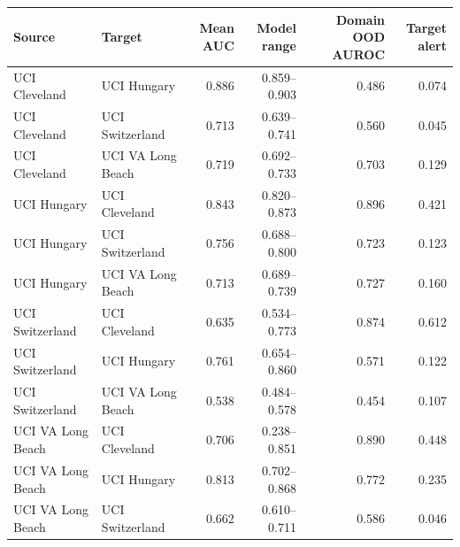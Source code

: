 \begin{tabular}{llrrrr}
\toprule
Source & Target & Mean AUC & Model range & Domain OOD AUROC & Target alert \\
\midrule
UCI Cleveland & UCI Hungary & 0.886 & 0.859--0.903 & 0.486 & 0.074 \\
UCI Cleveland & UCI Switzerland & 0.713 & 0.639--0.741 & 0.560 & 0.045 \\
UCI Cleveland & UCI VA Long Beach & 0.719 & 0.692--0.733 & 0.703 & 0.129 \\
UCI Hungary & UCI Cleveland & 0.843 & 0.820--0.873 & 0.896 & 0.421 \\
UCI Hungary & UCI Switzerland & 0.756 & 0.688--0.800 & 0.723 & 0.123 \\
UCI Hungary & UCI VA Long Beach & 0.713 & 0.689--0.739 & 0.727 & 0.160 \\
UCI Switzerland & UCI Cleveland & 0.635 & 0.534--0.773 & 0.874 & 0.612 \\
UCI Switzerland & UCI Hungary & 0.761 & 0.654--0.860 & 0.571 & 0.122 \\
UCI Switzerland & UCI VA Long Beach & 0.538 & 0.484--0.578 & 0.454 & 0.107 \\
UCI VA Long Beach & UCI Cleveland & 0.706 & 0.238--0.851 & 0.890 & 0.448 \\
UCI VA Long Beach & UCI Hungary & 0.813 & 0.702--0.868 & 0.772 & 0.235 \\
UCI VA Long Beach & UCI Switzerland & 0.662 & 0.610--0.711 & 0.586 & 0.046 \\
\bottomrule
\end{tabular}
